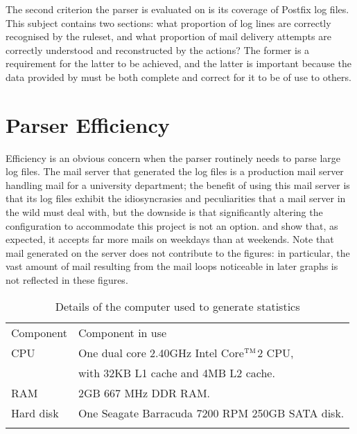 The second criterion the parser is evaluated on is its coverage of Postfix
log files.  This subject contains two sections: what proportion of log
lines are correctly recognised by the ruleset, and what proportion of mail
delivery attempts are correctly understood and reconstructed by the
actions?  The former is a requirement for the latter to be achieved, and
the latter is important because the data provided by \parsername{} must be
both complete and correct for it to be of use to others.

\section{Parser Efficiency}

\label{parser efficiency}

Efficiency is an obvious concern when the parser routinely needs to parse
large log files.  The mail server that generated the \numberOFlogFILES{}
log files is a production mail server handling mail for a university
department; the benefit of using this mail server is that its log files
exhibit the idiosyncrasies and peculiarities that a mail server in the wild
must deal with, but the downside is that significantly altering the
configuration to accommodate this project is not an option.
 and  show that, as expected, it accepts far more mails on
weekdays than at weekends.  Note that mail generated on the server does not
contribute to the figures: in particular, the vast amount of mail resulting
from the mail loops noticeable in later graphs is not reflected in these
figures.



\begin{table}[thbp]
    \caption{Details of the computer used to generate statistics}
    \empty{}\label{Details of the computer used to generate statistics}
    \centering{}
    \begin{tabular}[]{ll}
        \tabletopline{}%
        Component  & Component in use                                   \\
        \tablemiddleline{}%
        CPU         & One dual core 2.40GHz Intel\textregistered{}
                        Core$^{\textsc{TM}}$2 CPU,                      \\
                    & with 32KB L1 cache and 4MB L2 cache.              \\
        RAM         & 2GB 667 MHz DDR RAM\@.                            \\
        Hard disk   & One Seagate Barracuda 7200 RPM 250GB SATA disk.   \\
        \tablebottomline{}%
    \end{tabular}
\end{table}

